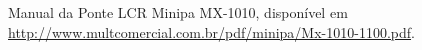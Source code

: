 \documentclass[a4paper]{instrumentacao}
\begin{document}
\begin{thebibliography}{9}
 Manual da Ponte LCR Minipa MX-1010, disponível em \url{http://www.multcomercial.com.br/pdf/minipa/Mx-1010-1100.pdf}.



\end{thebibliography}
\end{document}
